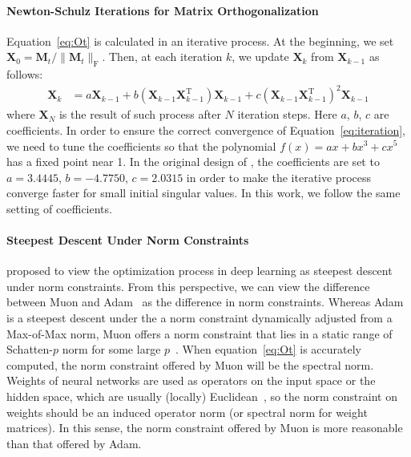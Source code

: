 \paragraph{Newton-Schulz Iterations for Matrix Orthogonalization}
Equation~\ref{eq:Ot} is calculated in an iterative process. At the beginning, we set $\mathbf{X}_0 = \mathbf{M}_t / \|\mathbf{M}_t\|_\mathrm{F}$. Then, at each iteration $k$, we update $\mathbf{X}_k$ from $\mathbf{X}_{k-1}$ as follows:
\begin{align}
    \mathbf{X}_k &= a \mathbf{X}_{k-1} + b (\mathbf{X}_{k-1} \mathbf{X}_{k-1}^\mathrm{T}) \mathbf{X}_{k-1} + c (\mathbf{X}_{k-1} \mathbf{X}_{k-1}^\mathrm{T})^2 \mathbf{X}_{k-1} \label{eq:iteration}
\end{align}
where $\mathbf{X}_N$ is the result of such process after $N$ iteration steps.
Here $a$, $b$, $c$ are coefficients. In order to ensure the correct convergence of Equation~\ref{eq:iteration}, we need to tune the coefficients so that the polynomial $f(x) = a x + b x^3 + c x^5$ has a fixed point near 1. In the original design of \cite{jordan2024muon}, the coefficients are set to $a = 3.4445$, $b = -4.7750$, $c = 2.0315$ in order to make the iterative process converge faster for small initial singular values. In this work, we follow the same setting of coefficients.

\paragraph{Steepest Descent Under Norm Constraints}
\cite{bernstein2024oldoptimizernewnorm} proposed to view the optimization process in deep learning as steepest descent under norm constraints. From this perspective, we can view the difference between Muon and Adam~\citep{adam2015kingma, loshchilov2018decoupled} as the difference in norm constraints. Whereas Adam is a steepest descent under the a norm constraint dynamically adjusted from a Max-of-Max norm, Muon offers a norm constraint that lies in a static range of Schatten-$p$ norm for some large $p$~\citep{muoncase2024cesista}. When equation~\ref{eq:Ot} is accurately computed, the norm constraint offered by Muon will be the spectral norm. Weights of neural networks are used as operators on the input space or the hidden space, which are usually (locally) Euclidean~\citep{cesista2024firstordernormedopt}, so the norm constraint on weights should be an induced operator norm (or spectral norm for weight matrices). In this sense, the norm constraint offered by Muon is more reasonable than that offered by Adam.

